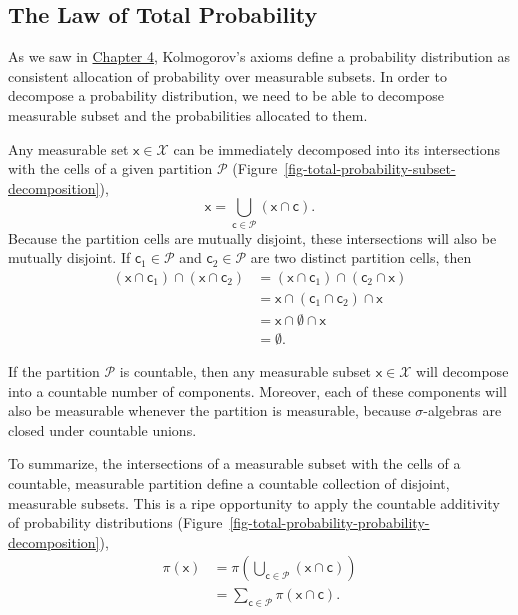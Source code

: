 \documentclass[
  letterpaper,
  DIV=11,
  numbers=noendperiod]{scrartcl}
\begin{document}
\subsection{The Law of Total
Probability}\label{the-law-of-total-probability}

As we saw in
\href{http://www.symplectomorphic.com/assets/chapters_html/probability_on_general_spaces.html}{Chapter
4}, Kolmogorov's axioms define a probability distribution as consistent
allocation of probability over measurable subsets. In order to decompose
a probability distribution, we need to be able to decompose measurable
subset and the probabilities allocated to them.

Any measurable set \(\mathsf{x} \in \mathcal{X}\) can be immediately
decomposed into its intersections with the cells of a given partition
\(\mathcal{P}\)
(Figure~\ref{fig-total-probability-subset-decomposition}), \[
\mathsf{x}
=
\bigcup_{\mathsf{c} \in \mathcal{P}}
\left( \mathsf{x} \cap \mathsf{c} \right).
\] Because the partition cells are mutually disjoint, these
intersections will also be mutually disjoint. If
\(\mathsf{c}_{1} \in \mathcal{P}\) and
\(\mathsf{c}_{2} \in \mathcal{P}\) are two distinct partition cells,
then \begin{align*}
( \mathsf{x} \cap \mathsf{c}_{1} ) \cap
( \mathsf{x} \cap \mathsf{c}_{2} )
&=
( \mathsf{x} \cap \mathsf{c}_{1} ) \cap
( \mathsf{c}_{2} \cap \mathsf{x}  )
\\
&=
\mathsf{x} \cap
( \mathsf{c}_{1} \cap \mathsf{c}_{2} ) \cap
\mathsf{x}
\\
&=
\mathsf{x} \cap \emptyset \cap \mathsf{x}
\\
&= \emptyset.
\end{align*}

If the partition \(\mathcal{P}\) is countable, then any measurable
subset \(\mathsf{x} \in \mathcal{X}\) will decompose into a countable
number of components. Moreover, each of these components will also be
measurable whenever the partition is measurable, because
\(\sigma\)-algebras are closed under countable unions.

To summarize, the intersections of a measurable subset with the cells of
a countable, measurable partition define a countable collection of
disjoint, measurable subsets. This is a ripe opportunity to apply the
countable additivity of probability distributions
(Figure~\ref{fig-total-probability-probability-decomposition}),
\begin{align*}
\pi(\mathsf{x})
&=
\pi \left( \bigcup_{\mathsf{c} \in \mathcal{P}}
           \left( \mathsf{x} \cap \mathsf{c} \right) \right)
\\
&=
\sum_{\mathsf{c} \in \mathcal{P}}
\pi( \mathsf{x} \cap \mathsf{c} ).
\end{align*}
\end{document}
